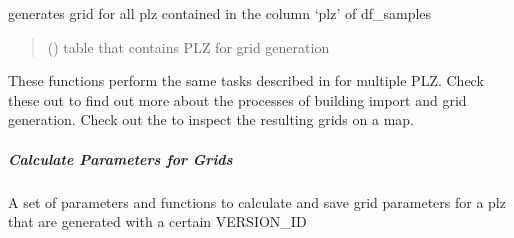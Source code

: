 \documentclass[letterpaper,10pt,english]{sphinxmanual}
\begin{document}
\begin{fulllineitems}
\label{\detokenize{classification/classification_steps/grid_generation_for_classification:classification.database_communication.perform_classification_tasks_for_multiple_plz.generate_grid_for_multiple_plz}}
\pysigstartsignatures
{}
\pysigstopsignatures
\sphinxAtStartPar
generates grid for all plz contained in the column ‘plz’ of df\_samples
\begin{quote}\begin{description}
\sphinxAtStartPar
{} () \textendash{} table that contains PLZ for grid generation

\end{description}\end{quote}

\end{fulllineitems}


\sphinxAtStartPar
These functions perform the same tasks described in {\hyperref[\detokenize{grid_generation/index::doc}]{}} for multiple PLZ.
Check these out to find out more about the processes of building import and grid generation.
Check out the {\hyperref[\detokenize{visualisation/qgis/qgis::doc}]{}} to inspect the resulting grids on a map.

\sphinxstepscope


\subparagraph{Calculate Parameters for Grids}
\label{\detokenize{classification/classification_steps/parameters:calculate-parameters-for-grids}}\label{\detokenize{classification/classification_steps/parameters::doc}}

\begin{fulllineitems}
\label{\detokenize{classification/classification_steps/parameters:classification.parameter_calculation.GridParameters.GridParameters}}
\pysigstartsignatures
{}
\pysigstopsignatures
\sphinxAtStartPar
A set of parameters and functions to calculate and save grid parameters
for a plz that are generated with a certain VERSION\_ID

\end{fulllineitems}
\end{document}
